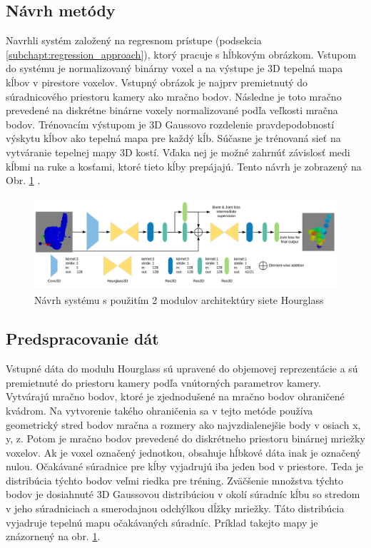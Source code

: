\subsection{Návrh metódy}
Navrhli systém založený na regresnom prístupe (podsekcia \ref{subchapt:regression_approach}), ktorý pracuje s hĺbkovým obrázkom. Vstupom do systému je normalizovaný binárny voxel a na výstupe je 3D tepelná mapa kĺbov v pirestore voxelov. Vstupný obrázok je najprv premietnutý do súradnicového priestoru kamery ako mračno bodov. Následne je toto mračno prevedené na diskrétne binárne voxely normalizované podľa veľkosti mračna bodov. Trénovacím výstupom je 3D Gaussovo rozdelenie pravdepodobností výskytu kĺbov ako tepelná mapa pre každý kĺb. Súčasne je trénovaná sieť na vytváranie tepelnej mapy 3D kostí. Vďaka nej je možné zahrnúť závislosť medi kĺbmi na ruke a kosťami, ktoré tieto kĺby prepájajú. Tento návrh je zobrazený na Obr. \ref{img:FuyangFramework} \cite{DBLP:journals/corr/hourglass}.

\begin{figure}[H]
	\begin{center}
		\includegraphics[height=130px]{images/231hourglass.png}
		\caption{Návrh systému s použitím 2 modulov architektúry siete Hourglass}
		\label{img:FuyangFramework}
	\end{center}
\end{figure}

\subsection{Predspracovanie dát}\label{hourglass:preprocessing}
Vstupné dáta do modulu Hourglass sú upravené do objemovej reprezentácie a sú premietnuté do priestoru kamery podľa vnútorných parametrov kamery. Vytvárajú mračno bodov, ktoré je zjednodušené na mračno bodov ohraničené kvádrom. Na vytvorenie takého ohraničenia sa v tejto metóde používa geometrický stred bodov mračna a rozmery ako najvzdialenejšie body v osiach x, y, z. Potom je mračno bodov prevedené do diskrétneho priestoru binárnej mriežky voxelov. Ak je voxel označený jednotkou, obsahuje hĺbkové dáta inak je označený nulou.
Očakávané súradnice pre kĺby vyjadrujú iba jeden bod v priestore. Teda je distribúcia týchto bodov veľmi riedka pre tréning. Zväčšenie množstva týchto bodov je dosiahnuté 3D Gaussovou distribúciou v okolí súradníc kĺbu so stredom v jeho súradniciach a smerodajnou odchýlkou dĺžky mriežky. Táto distribúcia vyjadruje tepelnú mapu očakávaných súradníc. Príklad takejto mapy je znázornený na obr. \ref{img:FuyangFramework}.

